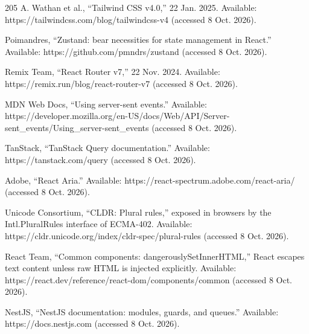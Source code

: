 \begin{thebibliography}{205}
 A. Wathan et al., ``Tailwind CSS v4.0,'' 22 Jan. 2025. Available: https:/\allowbreak{}/\allowbreak{}tailwindcss.\allowbreak{}com/\allowbreak{}blog/\allowbreak{}tailwindcss-\allowbreak{}v4 (accessed 8 Oct. 2026).

 Poimandres, ``Zustand: bear necessities for state management in React.'' Available: https:/\allowbreak{}/\allowbreak{}github.\allowbreak{}com/\allowbreak{}pmndrs/\allowbreak{}zustand (accessed 8 Oct. 2026).

 Remix Team, ``React Router v7,'' 22 Nov. 2024. Available: https:/\allowbreak{}/\allowbreak{}remix.\allowbreak{}run/\allowbreak{}blog/\allowbreak{}react-\allowbreak{}router-\allowbreak{}v7 (accessed 8 Oct. 2026).

 MDN Web Docs, ``Using server-sent events.'' Available: https:/\allowbreak{}/\allowbreak{}developer.\allowbreak{}mozilla.\allowbreak{}org/\allowbreak{}en-\allowbreak{}US/\allowbreak{}docs/\allowbreak{}Web/\allowbreak{}API/\allowbreak{}Server-\allowbreak{}sent\_\allowbreak{}events/\allowbreak{}Using\_\allowbreak{}server-\allowbreak{}sent\_\allowbreak{}events (accessed 8 Oct. 2026).

 TanStack, ``TanStack Query documentation.\allowbreak{}'' Available: https:/\allowbreak{}/\allowbreak{}tanstack.\allowbreak{}com/\allowbreak{}query (accessed 8 Oct. 2026).

 Adobe, ``React Aria.'' Available: https:/\allowbreak{}/\allowbreak{}react-\allowbreak{}spectrum.\allowbreak{}adobe.\allowbreak{}com/\allowbreak{}react-\allowbreak{}aria/ (accessed 8 Oct. 2026).

 Unicode Consortium, ``CLDR: Plural rules,'' exposed in browsers by the Intl.\allowbreak{}PluralRules interface of ECMA-402. Available: https:/\allowbreak{}/\allowbreak{}cldr.\allowbreak{}unicode.\allowbreak{}org/\allowbreak{}index/\allowbreak{}cldr-\allowbreak{}spec/\allowbreak{}plural-\allowbreak{}rules (accessed 8 Oct. 2026).

 React Team, ``Common components: dangerouslySetInnerHTML,'' React escapes text content unless raw HTML is injected explicitly. Available: https:/\allowbreak{}/\allowbreak{}react.\allowbreak{}dev/\allowbreak{}reference/\allowbreak{}react-\allowbreak{}dom/\allowbreak{}components/\allowbreak{}common (accessed 8 Oct. 2026).

 NestJS, ``NestJS documentation: modules, guards, and queues.'' Available: https:/\allowbreak{}/\allowbreak{}docs.\allowbreak{}nestjs.\allowbreak{}com (accessed 8 Oct. 2026).


\end{thebibliography}
